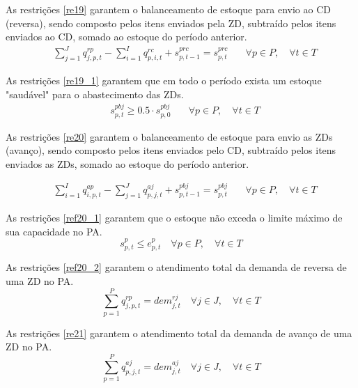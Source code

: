 As restrições \ref{re19} garantem o balanceamento de estoque para envio ao CD (reversa), sendo composto pelos itens enviados pela ZD, subtraído pelos itens enviados ao CD, somado ao estoque do período anterior.
\begin{equation}\label{re19}
\begin{aligned}
& \sum_{j=1}^{J} q^{rp}_{j,p,t} - \sum_{i=1}^{I} q^{rc}_{p,i,t} + s^{prc}_{p, t-1} = s^{prc}_{p, t}
\quad & \forall p \in P, \quad \forall t \in T
\end{aligned}
\end{equation}

As restrições \ref{re19_1} garantem que em todo o período exista um estoque "saudável" para o abastecimento das ZDs.
\begin{equation}\label{re19_1}
\begin{aligned}
& s^{pbj}_{p,t} \geq 0.5 \cdot s^{pbj}_{p,0} \quad & \forall p \in P, \quad \forall t \in T
\end{aligned}
\end{equation}

As restrições \ref{re20} garantem o balanceamento de estoque para envio as ZDs (avanço), sendo composto pelos itens enviados pelo CD, subtraído pelos itens enviados as ZDs, somado ao estoque do período anterior.

\begin{equation}\label{re20}
\begin{aligned}
& \sum_{i=1}^{I} q^{ap}_{i,p,t} - \sum_{j=1}^{J} q^{aj}_{p,j,t} + s^{pbj}_{p, t-1} = s^{pbj}_{p, t} \quad & \forall p \in P, \quad \forall t \in T
\end{aligned}
\end{equation}

As restrições \ref{ref20_1} garantem que o estoque não exceda o limite máximo de sua capacidade no PA.
\begin{equation}\label{ref20_1}
s^{p}_{p,t} \leq e^{p}_{p, t} \quad \forall p \in P, \quad \forall t \in T
\end{equation}

As restrições \ref{ref20_2} garantem o atendimento total da demanda de reversa de uma ZD no PA.
\begin{equation}\label{ref20_2}
\sum_{p=1}^{P} q^{rp}_{j,p,t} = dem^{rj}_{j, t} \quad \forall j \in J, \quad \forall t \in T
\end{equation}

As restrições \ref{re21} garantem o atendimento total da demanda de avanço de uma ZD no PA.
\begin{equation}\label{re21}
\sum_{p=1}^{P} q^{aj}_{p,j,t} = dem^{aj}_{j, t} \quad \forall j \in J, \quad \forall t \in T
\end{equation}

